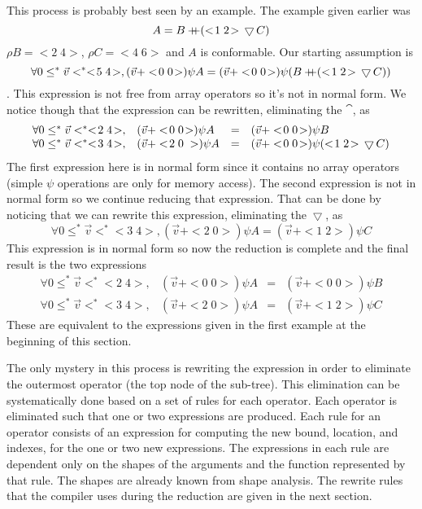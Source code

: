 This process is probably best seen by an example.  The example given earlier
was $$A=B+\!\!\!\!+(<\! 1\; 2\! > \,\bigtriangledown\, C)$$ $\rho B=<\! 2\; 4\! >$, $\rho 
C=<\! 4\; 6\! >$
and $A$ is conformable.  Our starting assumption is 
$$\forall 0\leq^{*}\vec{v}<^{*}<\! 5\; 4\!>, (\vec{v}+<\! 0\; 0\!>)\psi A=
(\vec{v}+<\! 0\; 0\!>)\psi (B\cat(<\! 1\; 2\! >\drop C))$$. 
This expression is not free from array operators
so it's not in normal form.  We notice though that the expression can be
rewritten, eliminating the $\cat$, as
$$\begin{array}{llll}
\forall 0\leq^{*}\vec{v}<^{*}<\! 2\; 4\!>, & (\vec{v}+<\! 0\; 0\!>)\psi A 
& = & (\vec{v}+<\! 0\; 0\!>)\psi B  \\
\forall 0\leq^{*}\vec{v}<^{*}<\! 3\; 4\!>, & (\vec{v}+<\! 2\; 0\;>)\psi A 
& = & (\vec{v}+<\! 0\; 0\!>)\psi (<\! 1\; 2\! >\drop C)
\end{array}$$
The first expression here is in normal form since it contains no array 
operators (simple $\psi$ operations are only for memory access).  The 
second expression is not in normal form so we continue reducing that
expression.  That can be done by noticing that we can rewrite this expression,
eliminating the $\,\bigtriangledown\,$, as
$$\forall 0\leq^{*}\vec{v}<^{*}<\! 3\; 4\!>, (\vec{v}+<\! 2\; 0\!>)\psi A  = 
(\vec{v}+<\! 1\; 2\!>)\psi C$$
This expression is in normal form so now the reduction is complete and the
final result is the two expressions
$$\begin{array}{llll}
\forall 0\leq^{*}\vec{v}<^{*}<\! 2\; 4\!>,& (\vec{v}+<\! 0\; 0\!>)\psi A 
& = & (\vec{v}+<\! 0\; 0\!>)\psi B  \\
\forall 0\leq^{*}\vec{v}<^{*}<\! 3\; 4\!>,& (\vec{v}+<\! 2\; 0\!>)\psi A 
& = & (\vec{v}+<\! 1\; 2\!>)\psi C
\end{array}$$
These are equivalent to the expressions given in the first example at the
beginning of this section.
 
The only mystery in this process is rewriting the expression in order to 
eliminate the outermost operator (the top node of the sub-tree).  This
elimination can be systematically done based on a set of rules for each
operator.  Each operator is eliminated such that one or two expressions are
produced.
Each rule for an operator consists of an expression for computing
the new bound, location, and indexes, for the one or two new expressions.  
The expressions in each rule are dependent only on the shapes of the arguments
and the function represented by that rule.  The shapes are already known from
shape analysis.  The rewrite rules that the compiler uses during the reduction
are given in the next section.
 

